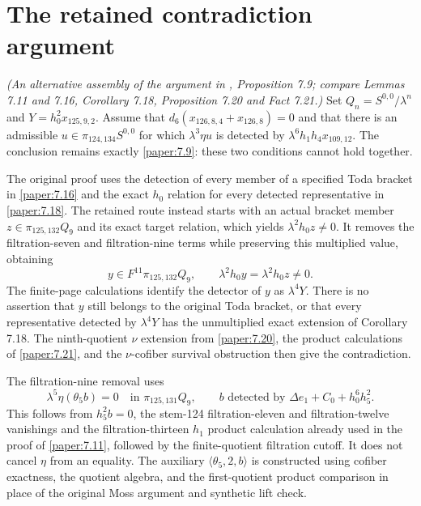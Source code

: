 \section{The retained contradiction argument}
\begin{remark}
\label{sem:Main:weak-representative-route}
\textit{(An alternative assembly of the argument in \cite{LWX126}, Proposition 7.9; compare Lemmas 7.11 and 7.16, Corollary 7.18, Proposition 7.20 and Fact 7.21.)}
Set $Q_n=S^{0,0}/\lambda^n$ and $Y=h_0^2x_{125,9,2}$.
Assume that $d_6(x_{126,8,4}+x_{126,8})=0$ and that there is an admissible
$u\in\pi_{124,134}S^{0,0}$ for which $\lambda^3\eta u$ is detected by
$\lambda^6h_1h_4x_{109,12}$. The conclusion remains exactly
\ref{paper:7.9}: these two conditions cannot hold together.

The original proof uses the detection of every member of a specified Toda
bracket in \ref{paper:7.16} and the exact $h_0$ relation for every detected
representative in \ref{paper:7.18}. The retained route instead starts with an
actual bracket member $z\in\pi_{125,132}Q_9$ and its exact target relation,
which yields $\lambda^2h_0z\ne0$. It removes the filtration-seven and
filtration-nine terms while preserving this multiplied value, obtaining
\[
 y\in F^{11}\pi_{125,132}Q_9,\qquad
 \lambda^2h_0y=\lambda^2h_0z\ne0.
\]
The finite-page calculations identify the detector of $y$ as $\lambda^4Y$.
There is no assertion that $y$ still belongs to the original Toda bracket,
or that every representative detected by $\lambda^4Y$ has the unmultiplied
exact extension of Corollary 7.18. The ninth-quotient $\nu$ extension from
\ref{paper:7.20}, the product calculations of \ref{paper:7.21}, and the
$\nu$-cofiber survival obstruction then give the contradiction.

The filtration-nine removal uses
\[
 \lambda^5\eta(\theta_5 b)=0\quad\text{in }\pi_{125,131}Q_9,
 \qquad b\text{ detected by }\Delta e_1+C_0+h_0^6h_5^2.
\]
This follows from $h_5^2b=0$, the stem-124 filtration-eleven and
filtration-twelve vanishings and the filtration-thirteen $h_1$ product
calculation already used in the proof of \ref{paper:7.11}, followed by the
finite-quotient filtration cutoff. It does not cancel $\eta$ from an
equality. The auxiliary $\langle\theta_5,2,b\rangle$ is constructed using
cofiber exactness, the quotient algebra, and the first-quotient product
comparison in place of the original Moss argument and synthetic lift check.


\end{remark}
